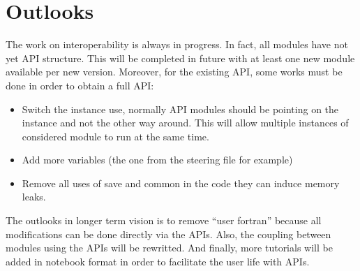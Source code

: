 \chapter{Outlooks}\label{ch:oulooks}

The work on \telemacsystem{} interoperability is always in progress. In fact, all
modules have not yet API structure.
This will be completed in future with at least one new module available per new
\telemacsystem{} version. Moreover, for the existing API, some works must be done
in order to obtain a full API\@:
\begin{itemize}
\item Switch the instance use, normally API modules should be pointing on the
instance and not the other way around. This will allow multiple instances of
considered module to run at the same time.
\item Add more variables (the one from the steering file for example)
\item Remove all uses of save and common in the code they can induce memory
leaks.
\end{itemize}
The outlooks in longer term vision is to remove ``user fortran'' because all
modifications can be done directly via the APIs. Also, the coupling between
modules using the APIs will be rewritted. And finally, more tutorials will be
added in notebook format in order to facilitate the user life with APIs.
